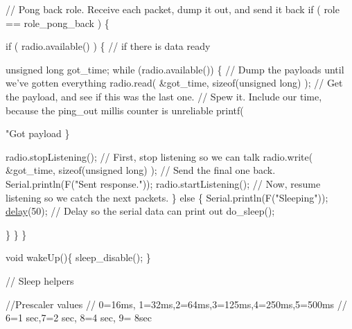 \begin{DoxyCodeInclude}
{  \textcolor{comment}{// Pong back role.  Receive each packet, dump it out, and send it back}
  \textcolor{keywordflow}{if} ( role == role\_pong\_back ) \{
    
    \textcolor{keywordflow}{if} ( radio.available() ) \{                                  \textcolor{comment}{// if there is data ready}
      
        \textcolor{keywordtype}{unsigned} \textcolor{keywordtype}{long} got\_time;
        \textcolor{keywordflow}{while} (radio.available()) \{                             \textcolor{comment}{// Dump the payloads until we've gotten
       everything}
          radio.read( &got\_time, \textcolor{keyword}{sizeof}(\textcolor{keywordtype}{unsigned} \textcolor{keywordtype}{long}) );       \textcolor{comment}{// Get the payload, and see if this was the
       last one.}
                                                                \textcolor{comment}{// Spew it.  Include our time, because the
       ping\_out millis counter is unreliable}
          printf(\textcolor{stringliteral}{"Got payload %
        \}
     
        radio.stopListening();                                  \textcolor{comment}{// First, stop listening so we can talk}
        radio.write( &got\_time, \textcolor{keyword}{sizeof}(\textcolor{keywordtype}{unsigned} \textcolor{keywordtype}{long}) );        \textcolor{comment}{// Send the final one back.}
        Serial.println(F(\textcolor{stringliteral}{"Sent response."}));
        radio.startListening();                                 \textcolor{comment}{// Now, resume listening so we catch the
       next packets.}
    \} \textcolor{keywordflow}{else} \{
        Serial.println(F(\textcolor{stringliteral}{"Sleeping"}));
        \hyperlink{group__Porting__General_ga70a331e8ddf9acf9d33c47b71cda4c5f}{delay}(50);                                             \textcolor{comment}{// Delay so the serial data can print
       out}
        do\_sleep();

    \}
  \}
\}

\textcolor{keywordtype}{void} wakeUp()\{
  sleep\_disable();
\}

\textcolor{comment}{// Sleep helpers}

\textcolor{comment}{//Prescaler values}
\textcolor{comment}{// 0=16ms, 1=32ms,2=64ms,3=125ms,4=250ms,5=500ms}
\textcolor{comment}{// 6=1 sec,7=2 sec, 8=4 sec, 9= 8sec}

}}
\end{DoxyCodeInclude}
